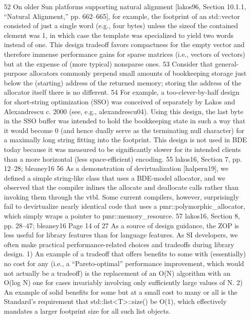 52 On older Sun platforms supporting natural alignment [lakos96, Section 10.1.1, “Natural
Alignment,” pp. 662–665], for example, the footprint of an std::vector consisted of just a single
word (e.g., four bytes) unless the sizeof the contained element was 1, in which case the template
was specialized to yield two words instead of one. This design tradeoff favors compactness for the
empty vector and therefore immense performance gains for sparse matrices (i.e., vectors of vectors)
but at the expense of (more typical) nonsparse ones.
53 Consider that general-purpose allocators commonly prepend small amounts of bookkeeping
storage just below the (starting) address of the returned memory; storing the address of the allocator
itself there is no different.
54 For example, a too-clever-by-half design for short-string optimization (SSO) was conceived of
separately by Lakos and Alexandrescu c. 2000 (see, e.g., alexandrescu04). Using this design, the last
byte in the SSO buffer was intended to hold the bookkeeping state in such a way that it would
become 0 (and hence dually serve as the terminating null character) for a maximally long string
fitting into the footprint. This design is not used in BDE today because it was measured to be
significantly slower for its intended clients than a more horizontal (less space-efficient) encoding.
55 lakos16, Section 7, pp. 12–28; bleaney16
56 As a demonstration of devirtualization [halpern19], we defined a simple string-like class that uses
a BDE-model allocator, and we observed that the compiler inlines the allocate and deallocate
calls rather than invoking them through the vtbl. Some current compilers, however, surprisingly fail
to devirtualize nearly identical code that uses a pmr::polymorphic_allocator, which simply wraps
a pointer to pmr::memory_resource. 57 lakos16, Section 8, pp. 28–47; bleaney16
Page 14 of 27
As a source of design guidance, the ZOP is less useful for library features than for
language features. As SI developers, we often make practical performance-related
choices and tradeoffs during library design.
1) An example of a tradeoff that offers benefits to some with (essentially) no cost
for any (i.e., a “Pareto-optimal” performance improvement, which would not
actually be a tradeoff) is the replacement of an O(N) algorithm with an O(log N)
one for cases invariably involving only sufficiently large values of N.
2) An example of solid benefits for some but at a small cost to many or all is the
Standard’s requirement that std::list<T>::size() be O(1), which
effectively mandates a larger footprint size for all such list objects.
